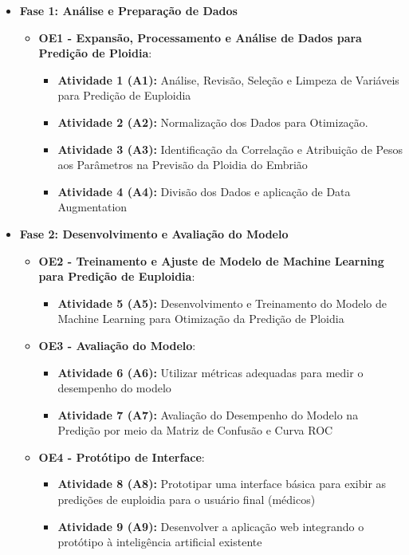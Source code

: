 \begin{itemize}
    \item \textbf{Fase 1: Análise e Preparação de Dados}
    \begin{itemize}
        \item \textbf{OE1 - Expansão, Processamento e Análise de Dados para Predição de Ploidia}: 
        \begin{itemize}
            \item \textbf{Atividade 1 (A1):} Análise, Revisão, Seleção e Limpeza de Variáveis para Predição de Euploidia 
            \item \textbf{Atividade 2 (A2):} Normalização dos Dados para Otimização.
            \item \textbf{Atividade 3 (A3):} Identificação da Correlação e Atribuição de Pesos aos Parâmetros na Previsão da Ploidia do Embrião 
            \item \textbf{Atividade 4 (A4):} Divisão dos Dados e aplicação de Data Augmentation
        \end{itemize}
    \end{itemize}

    \item \textbf{Fase 2: Desenvolvimento e Avaliação do Modelo}
    \begin{itemize}
        \item \textbf{OE2 - Treinamento e Ajuste de Modelo de Machine Learning para Predição de Euploidia}: 
        \begin{itemize}
            \item \textbf{Atividade 5 (A5):} Desenvolvimento e Treinamento do Modelo de Machine Learning para Otimização da Predição de Ploidia
        \end{itemize}

        \item \textbf{OE3 - Avaliação do Modelo}: 
        \begin{itemize}
            \item \textbf{Atividade 6 (A6):} Utilizar métricas adequadas para medir o desempenho do modelo
            \item \textbf{Atividade 7 (A7):} Avaliação do Desempenho do Modelo na Predição por meio da Matriz de Confusão e Curva ROC
        \end{itemize}

        \item \textbf{OE4 - Protótipo de Interface}: 
        \begin{itemize}
            \item \textbf{Atividade 8 (A8):} Prototipar uma interface básica para exibir as predições de euploidia para o usuário final (médicos)
            \item \textbf{Atividade 9 (A9):} Desenvolver a aplicação web integrando o protótipo à inteligência artificial existente
        \end{itemize}
    \end{itemize}
\end{itemize}

